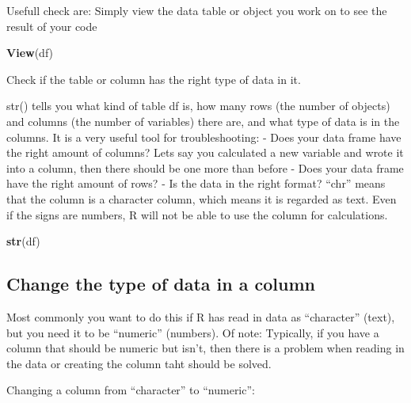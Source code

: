 \documentclass[
]{book}
\newenvironment{Shaded}{\begin{snugshade}}{\end{snugshade}}
\newcommand{\CommentTok}[1]{\textcolor[rgb]{0.56,0.35,0.01}{\textit{#1}}}
\newcommand{\FunctionTok}[1]{\textcolor[rgb]{0.13,0.29,0.53}{\textbf{#1}}}
\newcommand{\NormalTok}[1]{#1}
\newcommand{\OtherTok}[1]{\textcolor[rgb]{0.56,0.35,0.01}{#1}}
\newcommand{\SpecialCharTok}[1]{\textcolor[rgb]{0.81,0.36,0.00}{\textbf{#1}}}
\begin{document}
Usefull check are:
Simply view the data table or object you work on to see the result of your code

\begin{Shaded}
\begin{Highlighting}[]
\FunctionTok{View}\NormalTok{(df)}
\end{Highlighting}
\end{Shaded}

Check if the table or column has the right type of data in it.

str() tells you what kind of table df is, how many rows (the number of objects) and columns (the number of variables) there are, and what type of data is in the columns. It is a very useful tool for troubleshooting:
- Does your data frame have the right amount of columns? Lets say you calculated a new variable and wrote it into a column, then there should be one more than before
- Does your data frame have the right amount of rows?
- Is the data in the right format? ``chr'' means that the column is a character column, which means it is regarded as text. Even if the signs are numbers, R will not be able to use the column for calculations.

\begin{Shaded}
\begin{Highlighting}[]
\FunctionTok{str}\NormalTok{(df)}
\end{Highlighting}
\end{Shaded}

\subsection{Change the type of data in a column}\label{change-the-type-of-data-in-a-column}

Most commonly you want to do this if R has read in data as ``character'' (text), but you need it to be ``numeric'' (numbers).
Of note: Typically, if you have a column that should be numeric but isn't, then there is a problem when reading in the data or creating the column taht should be solved.

Changing a column from ``character'' to ``numeric'':

\begin{Shaded}
\end{Shaded}
\end{document}
